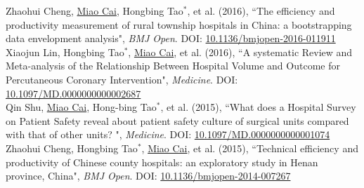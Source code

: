 \documentclass[11pt, a4paper]{article}
\newcommand{\years}[1]{\marginnote{\scriptsize #1}}
\begin{document}
\years{2016}Zhaohui Cheng, \underline{Miao Cai}, Hongbing Tao$^\ast$, et al. (2016), ``The efficiency and productivity measurement of rural township hospitals in China: a bootstrapping data envelopment analysis", \emph{BMJ Open}. DOI: \href{https://doi.org/10.1136/bmjopen-2016-011911}{10.1136/bmjopen-2016-011911}\\
\years{2016}Xiaojun Lin, Hongbing Tao$^\ast$, \underline{Miao Cai}, et al. (2016), ``A systematic Review and Meta-analysis of the Relationship Between Hospital Volume and Outcome for Percutaneous Coronary Intervention", \emph{Medicine}. DOI: \href{https://doi.org/10.1097/MD.0000000000002687}{10.1097/MD.0000000000002687}\\
\years{2015}Qin Shu, \underline{Miao Cai}, Hong-bing Tao$^\ast$, et al. (2015), ``What does a Hospital Survey on Patient Safety reveal about patient safety culture of surgical units compared with that of other units? ", \emph{Medicine}. DOI: \href{https://doi.org/10.1097/MD.0000000000001074}{10.1097/MD.0000000000001074}\\
\years{2015}Zhaohui Cheng, Hongbing Tao$^\ast$, \underline{Miao Cai}, et al. (2015), ``Technical efficiency and productivity of Chinese county hospitals: an exploratory study in Henan province, China", \emph{BMJ Open}. DOI: \href{https://doi.org/10.1136/bmjopen-2014-007267}{10.1136/bmjopen-2014-007267}
\end{document}
